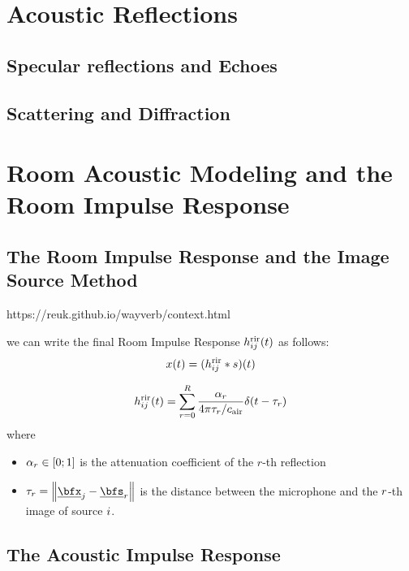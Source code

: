 \section{Acoustic Reflections}
\subsection{Specular reflections and Echoes}

\subsection{Scattering and Diffraction}

\section{Room Acoustic Modeling and the Room Impulse Response}

\subsection{The Room Impulse Response and the Image Source Method}
https://reuk.github.io/wayverb/context.html

 we can write the final Room Impulse Response $h^{\text{rir}}_{ij}(t)$ as follows:
\begin{equation}
    x(t) = (h^{\text{rir}}_{ij} \ast s)(t)
\end{equation}

\begin{equation}
    \rir_{ij}(t) = \sum_{r=0}^{R} \frac{\alpha_r}{4 \pi \tau_r / \cair} \delta \kparen{t - \tau_r}
\end{equation}
where
\begin{itemize}
    \item $\alpha_r \in \kintervcc{0}{1}$ is the attenuation coefficient of the $r$-th reflection
    \item $\tau_r = \norm{\positionMicrophone_\idxMic - \positionSource_\idxEch}$ is the distance between the microphone and the $r$-th image of source $i$.
\end{itemize}



\subsection{The Acoustic Impulse Response}

